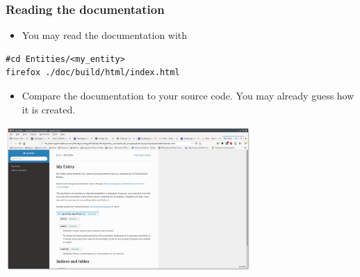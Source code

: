 \documentclass[logo=bluequo,normaltitle]{aaltoslides}
\begin{document}
\begin{frame}[t,fragile]
    \frametitle{Reading the documentation} 
    \begin{itemize}
        \item You may read the documentation with
    \end{itemize}
\begin{lstlisting}
#cd Entities/<my_entity>
firefox ./doc/build/html/index.html
\end{lstlisting}
    \begin{itemize}
        \item Compare the documentation to your source code. You may already
            guess how it is created.
    \end{itemize}
    \begin{center}
        \includegraphics[width=0.7\textwidth]{./Pics/Documentation.png}
    \end{center}
\end{frame}

\end{document}
